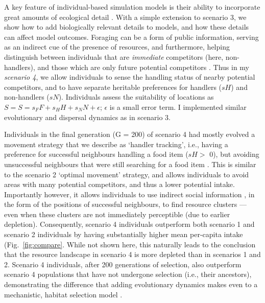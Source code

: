 A key feature of individual-based simulation models is their ability to incorporate great amounts of ecological detail \citep{deangelis2019}.
With a simple extension to scenario 3, we show how to add biologically relevant details to models, and how these details can affect model outcomes.
Foraging can be a form of public information, serving as an indirect cue of the presence of resources, and furthermore, helping distinguish between individuals that are \textit{immediate} competitors (here, non-handlers), and those which are only future potential competitors \citep[][; here, handlers]{dall2005,giraldeau2018,beauchamp2008,beauchamp2013}.
Thus in my \textit{scenario 4}, we allow individuals to sense the handling status of nearby potential competitors, and to have separate heritable preferences for handlers ($sH$) and non-handlers ($sN$).
Individuals assess the suitability of locations as $S = S = s_FF + s_HH + s_NN + \epsilon$; $\epsilon$ is a small error term.
I implemented similar evolutionary and dispersal dynamics as in scenario 3.

Individuals in the final generation (G = 200) of scenario 4 had mostly evolved a movement strategy that we describe as `handler tracking', i.e., having a preference for successful neighbours handling a food item ($sH >$ 0), but avoiding unsuccessful neighbours that were still searching for a food item \citep[($sN <$ 0)][]{gupte2021a,gupte2022c}.
This is similar to the scenario 2 `optimal movement' strategy, and allows individuals to avoid areas with many potential competitors, and thus a lower potential intake.
Importantly however, it allows individuals to use indirect social information \citep{dall2005,spiegel2016a}, in the form of the positions of successful neighbours, to find resource clusters --- even when these clusters are not immediately perceptible (due to earlier depletion).
Consequently, scenario 4 individuals outperform both scenario 1 and scenario 2 individuals by having substantially higher mean per-capita intake (Fig.~\ref{fig:compare}.
While not shown here, this naturally leads to the conclusion that the resource landscape in scenario 4 is more depleted than in scenarios 1 and 2.
Scenario 4 individuals, after 200 generations of selection, also outperform scenario 4 populations that have not undergone selection (i.e., their ancestors), demonstrating the difference that adding evolutionary dynamics makes even to a mechanistic, habitat selection model \citep[such as][]{white2018}.

